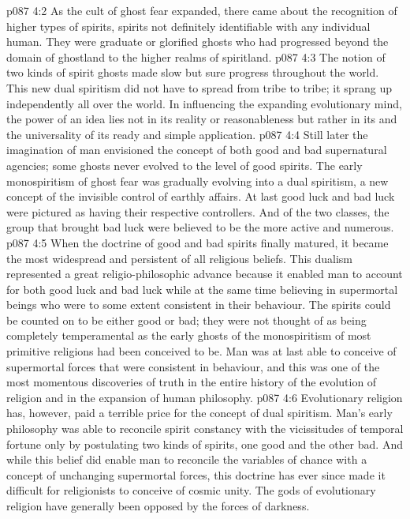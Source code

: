\vs p087 4:2 As the cult of ghost fear expanded, there came about the recognition of higher types of spirits, spirits not definitely identifiable with any individual human. They were graduate or glorified ghosts who had progressed beyond the domain of ghostland to the higher realms of spiritland.
\vs p087 4:3 The notion of two kinds of spirit ghosts made slow but sure progress throughout the world. This new dual spiritism did not have to spread from tribe to tribe; it sprang up independently all over the world. In influencing the expanding evolutionary mind, the power of an idea lies not in its reality or reasonableness but rather in its  and the universality of its ready and simple application.
\vs p087 4:4 Still later the imagination of man envisioned the concept of both good and bad supernatural agencies; some ghosts never evolved to the level of good spirits. The early monospiritism of ghost fear was gradually evolving into a dual spiritism, a new concept of the invisible control of earthly affairs. At last good luck and bad luck were pictured as having their respective controllers. And of the two classes, the group that brought bad luck were believed to be the more active and numerous.
\vs p087 4:5 \pc When the doctrine of good and bad spirits finally matured, it became the most widespread and persistent of all religious beliefs. This dualism represented a great religio\hyp{}philosophic advance because it enabled man to account for both good luck and bad luck while at the same time believing in supermortal beings who were to some extent consistent in their behaviour. The spirits could be counted on to be either good or bad; they were not thought of as being completely temperamental as the early ghosts of the monospiritism of most primitive religions had been conceived to be. Man was at last able to conceive of supermortal forces that were consistent in behaviour, and this was one of the most momentous discoveries of truth in the entire history of the evolution of religion and in the expansion of human philosophy.
\vs p087 4:6 Evolutionary religion has, however, paid a terrible price for the concept of dual spiritism. Man’s early philosophy was able to reconcile spirit constancy with the vicissitudes of temporal fortune only by postulating two kinds of spirits, one good and the other bad. And while this belief did enable man to reconcile the variables of chance with a concept of unchanging supermortal forces, this doctrine has ever since made it difficult for religionists to conceive of cosmic unity. The gods of evolutionary religion have generally been opposed by the forces of darkness.
